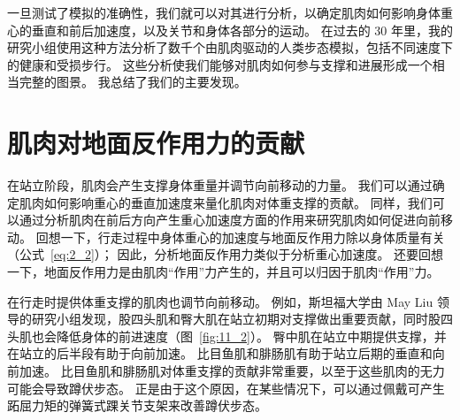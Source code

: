 一旦测试了模拟的准确性，我们就可以对其进行分析，以确定肌肉如何影响身体重心的垂直和前后加速度，以及关节和身体各部分的运动。
在过去的 30 年里，我的研究小组使用这种方法分析了数千个由肌肉驱动的人类步态模拟，包括不同速度下的健康和受损步行。
这些分析使我们能够对肌肉如何参与支撑和进展形成一个相当完整的图景。
我总结了我们的主要发现。


\section{肌肉对地面反作用力的贡献}

在站立阶段，肌肉会产生支撑身体重量并调节向前移动的力量。
我们可以通过确定肌肉如何影响重心的垂直加速度来量化肌肉对体重支撑的贡献。
同样，我们可以通过分析肌肉在前后方向产生重心加速度方面的作用来研究肌肉如何促进向前移动。
回想一下，行走过程中身体重心的加速度与地面反作用力除以身体质量有关（公式~\ref{eq:2_2}）；
因此，分析地面反作用力类似于分析重心加速度。
还要回想一下，地面反作用力是由肌肉“作用”力产生的，并且可以归因于肌肉“作用”力。


在行走时提供体重支撑的肌肉也调节向前移动。
例如，斯坦福大学由 May Liu 领导的研究小组发现，股四头肌和臀大肌在站立初期对支撑做出重要贡献，同时股四头肌也会降低身体的前进速度（图~\ref{fig:11_2}）。
臀中肌在站立中期提供支撑，并在站立的后半段有助于向前加速。
比目鱼肌和腓肠肌有助于站立后期的垂直和向前加速。
比目鱼肌和腓肠肌对体重支撑的贡献非常重要，以至于这些肌肉的无力可能会导致蹲伏步态。
正是由于这个原因，在某些情况下，可以通过佩戴可产生跖屈力矩的弹簧式踝关节支架来改善蹲伏步态。


